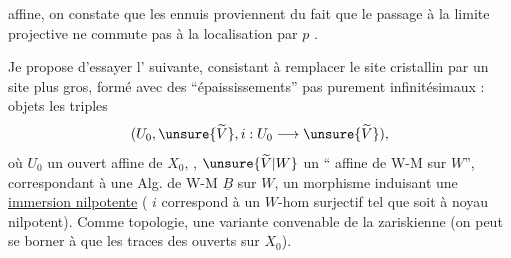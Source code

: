 affine, on constate que les ennuis proviennent du fait que le passage à la limite projective ne commute pas à la localisation par $p$
.

Je propose d'essayer l' suivante, consistant à remplacer le site cristallin par un site plus gros, formé avec des ``épaississements'' pas purement infinitésimaux : objets les triples
\[
(U_0,\unsure{\widetilde V},i:U_0\longrightarrow\unsure{\widetilde V}),
\]
où $U_0$ un ouvert affine de $X_0$, , $\unsure{\widetilde V|W}$ un `` affine de W-M sur $W$'',  correspondant à une Alg. de W-M $\underline B$ sur $W$,
un  morphisme  induisant une \uline{immersion nilpotente}
( $i$ correspond à un $W$-hom surjectif
tel que
soit à noyau nilpotent).
Comme topologie, une variante convenable de la zariskienne (on peut se borner à  que les traces des ouverts sur $X_0$).
